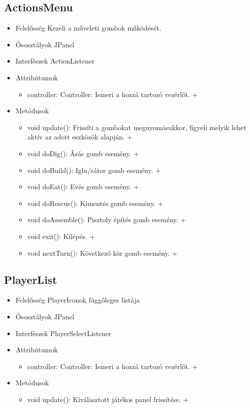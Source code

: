 \subsection{ActionsMenu}
\begin{itemize}
	\item Felelősség\newline
	Kezeli a műveleti gombok működését.
	\item Ősosztályok\newline
	JPanel
	\item Interfészek\newline
	ActionListener
	\item Attribútumok\newline
	\begin{itemize}
		\item controller: Controller: Ismeri a hozzá tartozó vezérlőt. +	
	\end{itemize}
	\item Metódusok\newline
	\begin{itemize}
		\item void update(): Frissíti a gombokat megnyomásukkor, figyeli melyik lehet aktív az adott eszközök alapján. +
		\item void doDig(): Ásás gomb esemény. +
		\item void doBuild(): Iglu/sátor gomb esemény. +
		\item void doEat(): Evés gomb esemény. +
		\item void doRescue(): Kimentés gomb esemény. +
		\item void doAssemble(): Pisztoly építés gomb esemény. +
		\item void exit(): Kilépés. +
		\item void nextTurn(): Következő kör gomb esemény. +
	\end{itemize}
\end{itemize}

\subsection{PlayerList}
\begin{itemize}
	\item Felelősség\newline
	PlayerIconok függőleges listája
	\item Ősosztályok\newline
	JPanel
	\item Interfészek\newline
	PlayerSelectListener
	\item Attribútumok\newline
	\begin{itemize}
		\item controller: Controller: Ismeri a hozzá tartozó vezérlőt. +	
	\end{itemize}
	\item Metódusok\newline
	\begin{itemize}
		\item void update(): Kiválasztott játékos panel frissítése. +
	\end{itemize}
\end{itemize}

